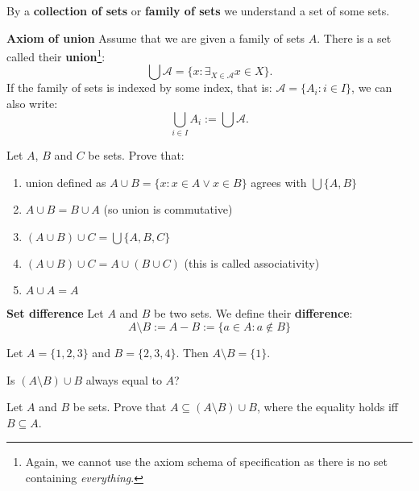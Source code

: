 \begin{definition}
  By a \textbf{collection of sets} or \textbf{family of sets} we understand a set of some sets.
\end{definition}

\begin{definition}
  \textbf{Axiom of union} Assume that we are given a family of sets $A$. There is a set called their \textbf{union}\footnote{Again, we cannot use the axiom schema of specification as there is no set containing \emph{everything}.}:
  $$\bigcup \mathcal A = \{x : \exists_{X\in \mathcal A} x\in X\}.$$
  If the family of sets is indexed by some index, that is: $\mathcal A = \{A_i : i\in I\}$, we can also write:
  $$\bigcup_{i\in I} A_i := \bigcup \mathcal A.$$
\end{definition}

\begin{exercise}
  Let $A$, $B$ and $C$ be sets. Prove that:
  \begin{enumerate}
    \item union defined as $A\cup B=\{x : x\in A \vee x\in B\}$ agrees with $\bigcup \{A, B\}$
    \item $A\cup B = B\cup A$ (so union is commutative)
    \item $(A\cup B)\cup C = \bigcup \{A,B,C\}$
    \item $(A\cup B)\cup C = A\cup (B\cup C)$ (this is called associativity)
    \item $A\cup A=A$
  \end{enumerate}
\end{exercise}

\begin{definition}
  \textbf{Set difference} Let $A$ and $B$ be two sets. We define their \textbf{difference}:
  $$A\setminus B := A-B := \{a \in A : a\notin B\}$$
\end{definition}

\begin{example}
  Let $A=\{1,2,3\}$ and $B=\{2,3,4\}$. Then $A\setminus B = \{1\}$.
\end{example}

\begin{exercise}
  Is $(A\setminus B) \cup B$ always equal to $A$?
\end{exercise}

\begin{exercise}
  Let $A$ and $B$ be sets. Prove that $A\subseteq (A\setminus B)\cup B$, where the equality holds iff $B\subseteq A$.
\end{exercise}

